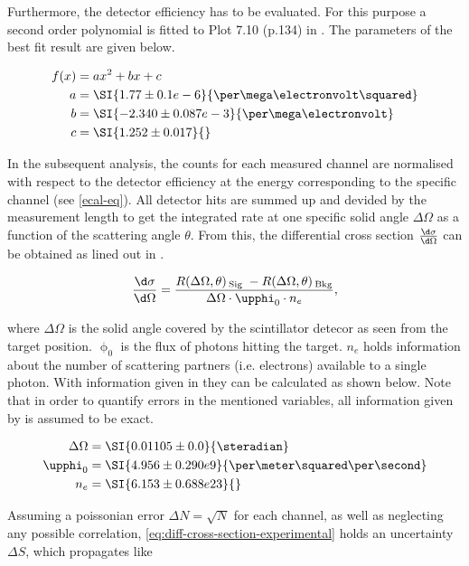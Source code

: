 Furthermore, the detector efficiency has to be evaluated. For this purpose a second
order polynomial is fitted to Plot 7.10 (p.134) in \cite{Sch17}. The parameters of 
the best fit result are given below. 

\begin{align*}
\label{eq:eq:efficiency-parameters}
	f(x) &= a x^2 + b x + c \\
	a &= \SI{1.77 \pm 0.1 e-6}{\per\mega\electronvolt\squared} \\
	b &= \SI{-2.340 \pm 0.087 e-3}{\per\mega\electronvolt} \\
	c &= \SI{1.252 \pm 0.017}{}
\end{align*}

In the subsequent analysis, the counts for each measured channel are normalised with
respect to the detector efficiency at the energy corresponding to the specific 
channel (see \autoref{ecal-eq}). All detector hits are summed up and devided by the 
measurement length to get the integrated rate at one specific solid angle 
$\Delta\Omega$ as a function of the scattering angle $\theta$.
From this, the differential cross section $\frac{\d\sigma}{\d\Omega}$ can be obtained
as lined out in \cite{Sch17}.

\begin{equation}
\label{eq:diff-cross-section-experimental}
	\frac{\d\sigma}{\d\Omega} = \frac{R(\Delta\Omega,\theta)\,_\text{Sig}\;-R(\Delta\Omega,\theta)\,_\text{Bkg}}{\Delta\Omega \cdot \upphi_0 \cdot n_e},
\end{equation}

where $\Delta\Omega$ is the solid angle covered by the scintillator detecor as seen
from the target position. $\upphi_0$ is the flux of photons hitting the target. $n_e$
holds information about the number of scattering partners (i.e. electrons) available
to a single photon. With information given in \cite{Sch17} they can be calculated as
shown below. Note that in order to quantify errors in the mentioned variables, all 
information given by \cite{Sch17} is assumed to be exact.

\begin{align*}
	\Delta\Omega &= \SI{0.01105 \pm 0.0}{\steradian} \\
	\upphi_0 &= \SI{4.956 \pm 0.290 e9}{\per\meter\squared\per\second} \\
	n_e &= \SI{6.153 \pm 0.688 e23}{} \\
\end{align*}

Assuming a poissonian error $\Delta N = \sqrt{N}$ for each channel, as well as
neglecting any possible correlation, \autoref{eq:diff-cross-section-experimental}
holds an uncertainty $\Delta S$, which propagates like

